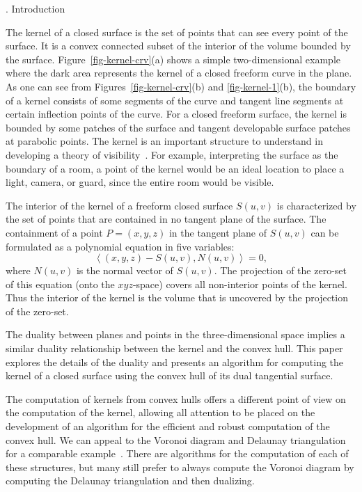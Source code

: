 \documentclass[twoside]{article}
\newcommand{\inner}[2]{\left<{#1}, {#2} \right>}
\newcounter{sectionc}\newcounter{subsectionc}\newcounter{subsubsectionc}
\renewcommand{\section}[1] {\vspace{12pt}\addtocounter{sectionc}{1} 
\setcounter{subsectionc}{0}\setcounter{subsubsectionc}{0}\noindent 
	{\tenbf\thesectionc. #1}\par\vspace{5pt}}
\newcommand{\textlineskip}{\baselineskip=13pt}
\begin{document}
\bigskip

\vspace*{1pt}\textlineskip	%
\section{Introduction}	%
\vspace*{-0.5pt}
\noindent
\label{sec-introduction}

The kernel of a closed surface is the set of points
that can see every point of the surface.
It is a convex connected subset of the interior of the volume
bounded by the surface.
Figure~\ref{fig-kernel-crv}(a) shows a simple two-dimensional example
where the dark area represents the kernel of a closed freeform curve
in the plane.  As one can see from Figures~\ref{fig-kernel-crv}(b) and 
\ref{fig-kernel-1}(b), the boundary of 
a kernel consists of some segments of the curve and tangent line segments
at certain inflection points of the curve.
For a closed freeform surface, the kernel is bounded by some patches
of the surface and tangent developable surface patches at parabolic points.
The kernel is an important structure to understand in developing
a theory of visibility~\cite{1}.  For example, interpreting the surface 
as the boundary of a room, a point of the kernel would be an ideal
location to place a light, camera, or guard,
since the entire room would be visible.

The interior of the kernel of a freeform closed surface $S(u,v)$
is characterized by the set of points that are contained
in no tangent plane of the surface.  The containment of
a point $P = (x,y,z)$ in the tangent plane of $S(u,v)$ can be
formulated as a polynomial equation in five variables:
\[
\inner{(x,y,z)-S(u,v)}{N(u,v)} = 0,
\]
where $N(u,v)$ is the normal vector of $S(u,v)$.
The projection of the zero-set of this equation
(onto the $xyz$-space) covers all non-interior points of the kernel.
Thus the interior of the kernel is the volume
that is uncovered by the projection of the zero-set.

The duality between planes and points in the three-dimensional space
implies a similar duality relationship between the kernel and
the convex hull.  This paper explores the details of the duality
and presents an algorithm for computing the kernel of a closed surface
using the convex hull of its dual tangential surface.

The computation of kernels from convex hulls offers a different point of
view on the computation of the kernel, allowing all attention
to be placed on the development of an algorithm
for the efficient and robust computation of the convex hull.
We can appeal to the Voronoi diagram and Delaunay triangulation
for a comparable example~\cite{1}.  There are algorithms for the computation of
each of these structures, but many still prefer to always compute
the Voronoi diagram by computing the Delaunay triangulation and then dualizing.
\end{document}
